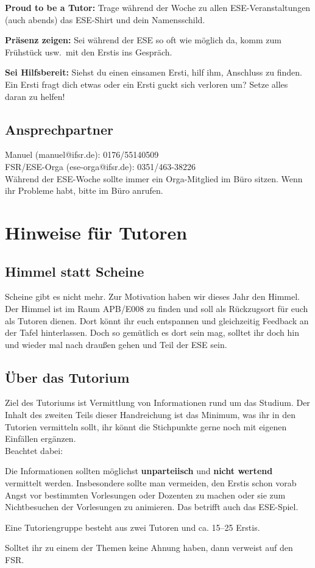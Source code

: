 \documentclass[a4paper,12pt]{report}
\begin{document}
\begin{itemize*}
    \item \textbf{Proud to be a Tutor:} Trage während der Woche zu allen ESE-Veranstaltungen (auch abends) das ESE-Shirt und dein Namensschild.
    \item \textbf{Präsenz zeigen:} Sei während der ESE so oft wie möglich da, komm zum Frühstück usw.\ mit den Erstis ins Gespräch.
    \item \textbf{Sei Hilfsbereit:} Siehst du einen einsamen Ersti, hilf ihm, Anschluss zu finden. Ein Ersti fragt dich etwas oder ein Ersti guckt sich verloren um? Setze alles daran zu helfen!
\end{itemize*}

\section*{Ansprechpartner}
Manuel (manuel@ifsr.de): 0176/55140509 \\
FSR/ESE-Orga (ese-orga@ifsr.de): 0351/463-38226 \\

Während der ESE-Woche sollte immer ein Orga-Mitglied im Büro sitzen. Wenn ihr Probleme habt, bitte im Büro anrufen.

\tableofcontents
\chapter{Hinweise für Tutoren}
\section{Himmel statt Scheine}
Scheine gibt es nicht mehr. Zur Motivation haben wir dieses Jahr den Himmel. Der Himmel ist im Raum APB/E008 zu finden und soll als Rückzugsort für euch als Tutoren dienen. Dort könnt ihr euch entspannen und gleichzeitig Feedback an der Tafel hinterlassen. Doch so gemütlich es dort sein mag, solltet ihr doch hin und wieder mal nach draußen gehen und Teil der ESE sein.

\section{Über das Tutorium}
Ziel des Tutoriums ist Vermittlung von Informationen rund um das Studium. Der Inhalt des zweiten Teils dieser Handreichung ist das Minimum, was ihr in den Tutorien vermitteln sollt, ihr könnt die Stichpunkte gerne noch mit eigenen Einfällen ergänzen.\\
Beachtet dabei:
\begin{itemize*}
\item Die Informationen sollten möglichst \textbf{unparteiisch} und \textbf{nicht wertend} vermittelt werden.
Insbesondere sollte man vermeiden, den Erstis schon vorab Angst vor bestimmten Vorlesungen oder Dozenten zu machen oder sie zum Nichtbesuchen der Vorlesungen zu animieren. Das betrifft auch das ESE-Spiel.
\item Eine Tutoriengruppe besteht aus zwei Tutoren und ca. 15--25 Erstis.
\item Solltet ihr zu einem der Themen keine Ahnung haben, dann verweist auf den FSR\@.
\end{itemize*}
\end{document}
